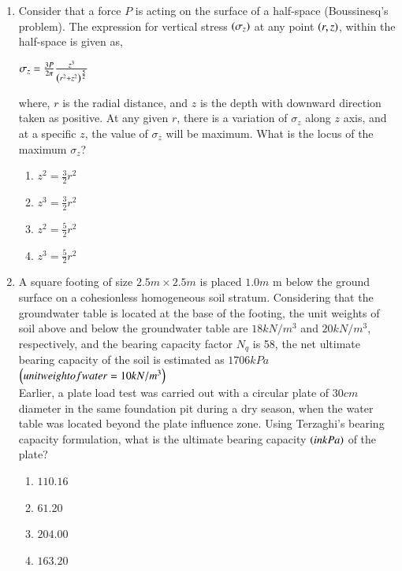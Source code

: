 \documentclass[journal,14pt,onecolumn]{IEEEtran}
\theoremstyle{remark}
\begin{document}
\begin{enumerate}[label={Q\arabic*.}]
\item Consider that a force $P$ is acting on the surface of a half-space (Boussinesq’s problem). The expression for vertical stress $\left(\sigma_z\right)$ at any point $\left(r,z\right)$, within the half-space is given as,
\vspace{0.1cm}
\begin{center}
    \Large$\sigma_z=\frac{3P}{2\pi}\frac{z^3}{\left(r^2+z^2\right)^\frac{5}{2}}$
\end{center}
\vspace{0.1cm}
where, $r$ is the radial distance, and $z$ is the depth with downward direction taken as positive. At any given $r$, there is a variation of $\sigma_z$ along $z$ axis, and at a specific $z$, the value of $\sigma_z$ will be maximum. What is the locus of the maximum $\sigma_z$?
\begin{enumerate}
    \item $z^2=\frac{3}{2}r^2$
    \item $z^3=\frac{3}{2}r^2$
    \item $z^2=\frac{5}{2}r^2$
    \item $z^3=\frac{5}{2}r^2$
\end{enumerate}
\vspace{1cm}

\item A square footing of size $2.5m\times2.5m$ is placed $1.0m$ m below the ground surface on a cohesionless homogeneous soil stratum. Considering that the groundwater table is located at the base of the footing, the unit weights of soil above and below the groundwater table are $18kN/m^3$ and $20kN/m^3$, respectively, and the bearing capacity factor $N_q$ is 58, the net ultimate bearing capacity of the soil is estimated as $1706kPa$ $\left(unit weight of water=10kN/m^3\right)$\\
Earlier, a plate load test was carried out with a circular plate of $30cm$ diameter in the same foundation pit during a dry season, when the water table was located beyond the plate influence zone. Using Terzaghi’s bearing capacity formulation, what is the ultimate bearing capacity $\left(in kPa\right)$ of the plate?
\begin{enumerate}
    \item $110.16$
    \item $61.20$
    \item $204.00$
    \item $163.20$
\end{enumerate}
\vspace{1cm}


\end{enumerate}
\end{document}
